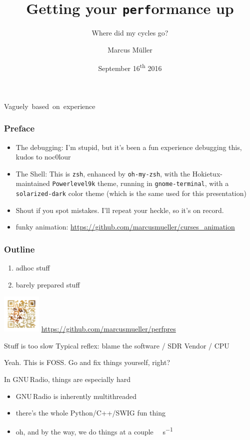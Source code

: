 \documentclass[aspectratio=169]{beamer}
\title {Getting your \texttt{perf}ormance up}
\author{Marcus Müller}
\institute{Ettus Research}
\date{September 16\textsuperscript{th} 2016}
\subtitle{Where did my cycles go?}
\newcommand{\GR}{GNU\,Radio\xspace}
\begin{document}
\begin{frame}{}
  \titlepage
\mbox{\small Vaguely based on experience} 
\end{frame}
\begin{frame}
  \frametitle{Preface}
  \begin{itemize}
  \item The debugging: I'm stupid, but it's been a fun experience debugging
    this, kudos to noc0lour
  \item The Shell: This is \lstinline{zsh}, enhanced by \lstinline{oh-my-zsh},
    with the Hokietux-maintained \lstinline{Powerlevel9k} theme, running in
    \lstinline{gnome-terminal}, with a \lstinline{solarized-dark} color theme
    (which is the same used for this presentation)
    \item Shout if you spot mistakes. I'll repeat your heckle, so it's on
      record.
      \item funky animation: \url{https://github.com/marcusmueller/curses_animation}
  \end{itemize}
\end{frame}
\begin{frame}
  \frametitle{Outline}
  {\begin{enumerate}
  \item<2-> adhoc stuff
    \item<3-> barely prepared stuff
    \end{enumerate}}
    \includegraphics[height=5em]{qr}\hfill
    \url{https://github.com/marcusmueller/perfpres}
\end{frame}

\begin{frame}{Stuff is too slow}
  Typical reflex: blame the software / SDR Vendor / CPU

  Yeah. This is FOSS. Go and fix things yourself, right?
\end{frame}

\begin{frame}{In \GR, things are especially hard}
  \begin{itemize}
  \item \GR is inherently multithreaded
  \item there's the whole Python/C++/SWIG fun thing
    \item oh, and by the way, we do things at a couple
      \si{\mega\sample\per\second}
  \end{itemize}
\end{frame}
\end{document}
